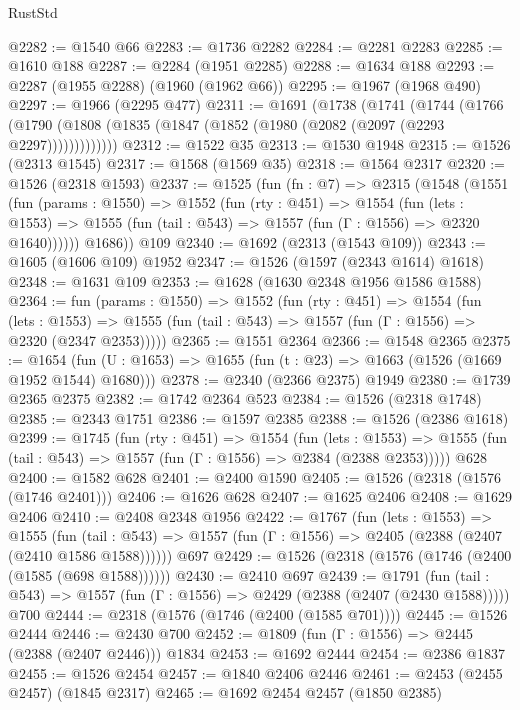 \begin{lexlean}{RustStd}
\begin{coremodule}
@2282 := @1540 @66
@2283 := @1736 @2282
@2284 := @2281 @2283
@2285 := @1610 @188
@2287 := @2284 (@1951 @2285)
@2288 := @1634 @188
@2293 := @2287 (@1955 @2288) (@1960 (@1962 @66))
@2295 := @1967 (@1968 @490)
@2297 := @1966 (@2295 @477)
@2311 := @1691
    (@1738
      (@1741
        (@1744
          (@1766 (@1790 (@1808 (@1835 (@1847 (@1852 (@1980 (@2082 (@2097 (@2293 @2297)))))))))))))
@2312 := @1522 @35
@2313 := @1530 @1948
@2315 := @1526 (@2313 @1545)
@2317 := @1568 (@1569 @35)
@2318 := @1564 @2317
@2320 := @1526 (@2318 @1593)
@2337 := @1525
    (fun (fn : @7) =>
    @2315
      (@1548
        (@1551
          (fun (params : @1550) =>
          @1552
            (fun (rty : @451) =>
            @1554
              (fun (lets : @1553) =>
              @1555 (fun (tail : @543) => @1557 (fun (Γ : @1556) => @2320 @1640))))))
        @1686))
    @109
@2340 := @1692 (@2313 (@1543 @109))
@2343 := @1605 (@1606 @109) @1952
@2347 := @1526 (@1597 (@2343 @1614) @1618)
@2348 := @1631 @109
@2353 := @1628 (@1630 @2348 @1956 @1586 @1588)
@2364 := fun (params : @1550) =>
  @1552
    (fun (rty : @451) =>
    @1554
      (fun (lets : @1553) =>
      @1555 (fun (tail : @543) => @1557 (fun (Γ : @1556) => @2320 (@2347 @2353)))))
@2365 := @1551 @2364
@2366 := @1548 @2365
@2375 := @1654 (fun (U : @1653) => @1655 (fun (t : @23) => @1663 (@1526 (@1669 @1952 @1544) @1680)))
@2378 := @2340 (@2366 @2375) @1949
@2380 := @1739 @2365 @2375
@2382 := @1742 @2364 @523
@2384 := @1526 (@2318 @1748)
@2385 := @2343 @1751
@2386 := @1597 @2385
@2388 := @1526 (@2386 @1618)
@2399 := @1745
    (fun (rty : @451) =>
    @1554
      (fun (lets : @1553) =>
      @1555 (fun (tail : @543) => @1557 (fun (Γ : @1556) => @2384 (@2388 @2353)))))
    @628
@2400 := @1582 @628
@2401 := @2400 @1590
@2405 := @1526 (@2318 (@1576 (@1746 @2401)))
@2406 := @1626 @628
@2407 := @1625 @2406
@2408 := @1629 @2406
@2410 := @2408 @2348 @1956
@2422 := @1767
    (fun (lets : @1553) =>
    @1555
      (fun (tail : @543) => @1557 (fun (Γ : @1556) => @2405 (@2388 (@2407 (@2410 @1586 @1588))))))
    @697
@2429 := @1526 (@2318 (@1576 (@1746 (@2400 (@1585 (@698 @1588))))))
@2430 := @2410 @697
@2439 := @1791
    (fun (tail : @543) => @1557 (fun (Γ : @1556) => @2429 (@2388 (@2407 (@2430 @1588)))))
    @700
@2444 := @2318 (@1576 (@1746 (@2400 (@1585 @701))))
@2445 := @1526 @2444
@2446 := @2430 @700
@2452 := @1809 (fun (Γ : @1556) => @2445 (@2388 (@2407 @2446))) @1834
@2453 := @1692 @2444
@2454 := @2386 @1837
@2455 := @1526 @2454
@2457 := @1840 @2406 @2446
@2461 := @2453 (@2455 @2457) (@1845 @2317)
@2465 := @1692 @2454 @2457 (@1850 @2385)

\end{coremodule}
\end{lexlean}
